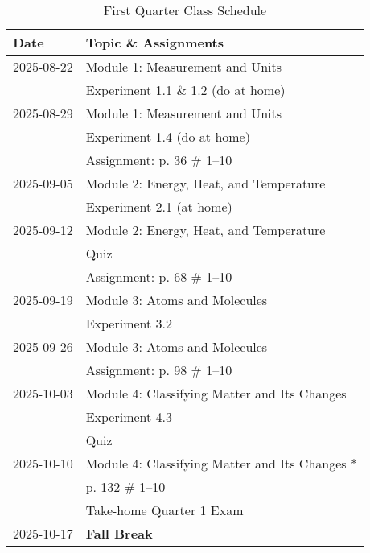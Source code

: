 \documentclass[11pt, oneside]{article}   	%
\begin{document}
\begin{table}[h]
\centering
\begin{tabular}{ l | l }
Date & Topic \& Assignments \\
\hline
2025-08-22 & Module 1:  Measurement and Units \\
                   & Experiment 1.1 \& 1.2 (do at home) \\
\hline

2025-08-29 & Module 1:  Measurement and Units \\
                   & Experiment 1.4 (do at home) \\
                   & Assignment: p. 36 \# 1--10 \\
\hline

2025-09-05 & Module 2: Energy, Heat, and Temperature \\
                   & Experiment 2.1 (at home) \\
\hline

2025-09-12 & Module 2: Energy, Heat, and Temperature \\
	           & Quiz \\
	           & Assignment: p. 68 \# 1--10 \\ 
\hline

2025-09-19 & Module 3: Atoms and Molecules \\
                   & Experiment 3.2 \\
\hline

2025-09-26 & Module 3: Atoms and Molecules \\
                   & Assignment: p. 98 \# 1--10 \\ 
\hline

2025-10-03 & Module 4: Classifying Matter and Its Changes \\
                    & Experiment 4.3 \\
                    & Quiz \\
\hline

2025-10-10 & Module 4: Classifying Matter and Its Changes * \\
                   & p. 132 \# 1--10 \\
                   & Take-home Quarter 1 Exam \\
\hline

2025-10-17 & \textbf{Fall Break} \\

\end{tabular}
\caption{First Quarter Class Schedule}\label{table:class-schedule-q1}
\end{table}
\end{document}
